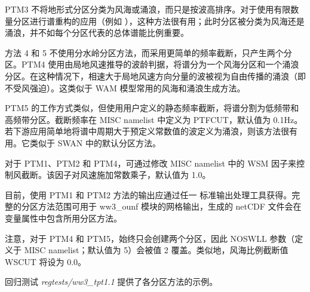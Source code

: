 PTM3 不将地形式分区分类为风海或涌浪，而只是按波高排序。对于使用有限数量分区进行谱重构的应用（例如 \cite{pro:BSP13}），这种方法很有用；此时分区被分类为风海还是涌浪，并不如每个分区代表的总体谱能比例重要。

方法 4 和 5 不使用分水岭分区方法，而采用更简单的频率截断，只产生两个分区。PTM4 使用由局地风速推导的波龄判据，将谱分为一个风海分区和一个涌浪分区。在这种情况下，相速大于局地风速方向分量的波被视为自由传播的涌浪（即不受风强迫）。这类似于 WAM 模型常用的风海和涌浪生成方法。

PTM5 的工作方式类似，但使用用户定义的静态频率截断，将谱分割为低频带和高频带分区。截断频率在 MISC namelist 中定义为 PTFCUT，默认值为 0.1Hz。若下游应用简单地将谱中周期大于预定义常数值的波定义为涌浪，则该方法很有用。它类似于 SWAN 中的默认分区方法。

对于 PTM1、PTM2 和 PTM4，可通过修改 MISC namelist 中的 WSM 因子来控制风截断。该因子对风速施加常数乘子，默认值为 1.0。

目前，使用 PTM1 和 PTM2 方法的输出应通过任一 \ws{} 标准输出处理工具获得。完整的分区方法范围可用于 ww3\_ounf 模块的网格输出，生成的 netCDF 文件会在变量属性中包含所用分区方法。

注意，对于 PTM4 和 PTM5，始终只会创建两个分区，因此 NOSWLL 参数（定义于 MISC namelist；默认值为 5）会被值 2 覆盖。类似地，风海比例截断值 WSCUT 将设为 0.0。

回归测试 \emph{regtests/ww3\_tpt1.1} 提供了各分区方法的示例。
